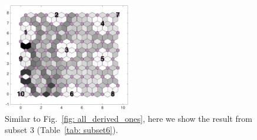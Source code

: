 \begin{figure}
        \centering
        \includegraphics[width=0.5\textwidth]{../../images0.01/M31/2D/image_subsets/subset6_dist_with_hits_t.png}
    \caption{Similar to Fig.~\ref{fig: all_derived_ones}, here we show the result from subset 3 (Table~\ref{tab: subset6}).}
    \label{fig: subset6}
\end{figure}